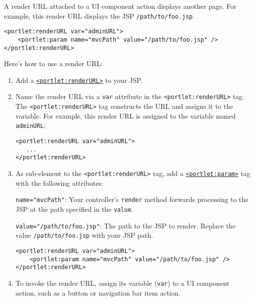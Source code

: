 A render URL attached to a UI component action displays another page.
For example, this render URL displays the JSP \texttt{/path/to/foo.jsp}.

\begin{verbatim}
<portlet:renderURL var="adminURL">
    <portlet:param name="mvcPath" value="/path/to/foo.jsp" />
</portlet:renderURL>
\end{verbatim}

Here's how to use a render URL:

\begin{enumerate}
\def\labelenumi{\arabic{enumi}.}
\item
  Add a
  \href{https://docs.liferay.com/dxp/portal/7.2-latest/taglibs/util-taglib/portlet/renderURL.html}{\texttt{\textless{}portlet:renderURL\textgreater{}}}
  to your JSP.
\item
  Name the render URL via a \texttt{var} attribute in the
  \texttt{\textless{}portlet:renderURL\textgreater{}} tag. The
  \texttt{\textless{}portlet:renderURL\textgreater{}} tag constructs the
  URL and assigns it to the variable. For example, this render URL is
  assigned to the variable named \texttt{adminURL}:

\begin{verbatim}
<portlet:renderURL var="adminURL">
   ...
</portlet:renderURL>
\end{verbatim}
\item
  As sub-element to the
  \texttt{\textless{}portlet:renderURL\textgreater{}} tag, add a
  \href{https://docs.liferay.com/dxp/portal/7.2-latest/taglibs/util-taglib/portlet/param.html}{\texttt{\textless{}portlet:param\textgreater{}}}
  tag with the following attributes:

  \texttt{name="mvcPath"}: Your controller's \texttt{render} method
  forwards processing to the JSP at the path specified in the
  \texttt{value}.

  \texttt{value="/path/to/foo.jsp"}: The path to the JSP to render.
  Replace the value \texttt{/path/to/foo.jsp} with your JSP path.

\begin{verbatim}
<portlet:renderURL var="adminURL">
    <portlet:param name="mvcPath" value="/path/to/foo.jsp" />
</portlet:renderURL>
\end{verbatim}
\item
  To invoke the render URL, assign its variable (\texttt{var}) to a UI
  component action, such as a button or navigation bar item action.
\end{enumerate}

